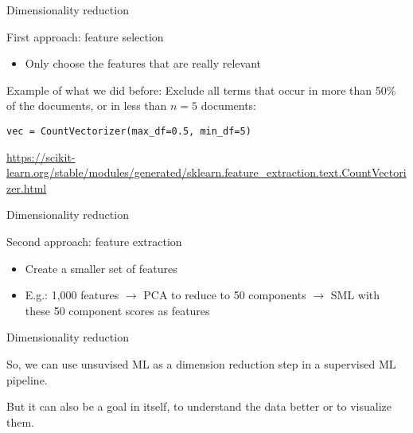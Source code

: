 \documentclass[compress]{beamer}
\begin{document}
\begin{frame}[fragile]{Dimensionality reduction}

\begin{block}{First approach: feature selection}
\begin{itemize}
\item Only choose the features that are really relevant
\end{itemize}
\end{block}


Example of what we did before: Exclude all terms that occur in more than 50\% of the documents, or in less than $n=5$ documents:

\begin{lstlisting}
vec = CountVectorizer(max_df=0.5, min_df=5)
\end{lstlisting}

\tiny{\url{https://scikit-learn.org/stable/modules/generated/sklearn.feature\_extraction.text.CountVectorizer.html}}

\end{frame}





\begin{frame}[fragile]{Dimensionality reduction}

\begin{block}{Second approach: feature extraction}
\begin{itemize}
\item Create a smaller set of features
\item E.g.: 1,000 features $\rightarrow$ PCA to reduce to 50 components $\rightarrow$ SML with these 50 component scores as features
\end{itemize}
\end{block}

\end{frame}



\begin{frame}[fragile]{Dimensionality reduction}

So, we can use unsuvised ML as a dimension reduction step in a supervised ML pipeline. 

\vspace{0.5cm}
But it can also be a goal in itself, to understand the data better or to visualize them.
\end{frame}
\end{document}
